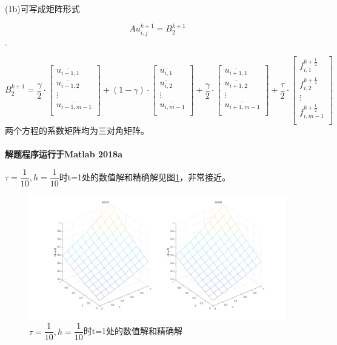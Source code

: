 \documentclass[withoutpreface,bwprint]{cumcmthesis} %
\begin{document}
(1b)可写成矩阵形式

$$A u_{i,j}^{k+1}=B_2^{k+1}$$.

$$
B_2^{k+1}=
\dfrac{\gamma}{2}\cdot
\begin{bmatrix}
\overline{u_{i-1,1}} \\
\overline{u_{i-1,2}} \\
\vdots \\
\overline{u_{i-1,m-1}} \\
\end{bmatrix}
+(1-\gamma) \cdot
\begin{bmatrix}
\overline{u_{i,1}} \\
\overline{u_{i,2}} \\
\vdots \\
\overline{u_{i,m-1}} \\
\end{bmatrix}
+\dfrac{\gamma}{2}\cdot
\begin{bmatrix}
\overline{u_{i+1,1}} \\
\overline{u_{i+1,2}} \\
\vdots \\
\overline{u_{i+1,m-1}} \\
\end{bmatrix}
+\dfrac{\tau}{2} \cdot
\begin{bmatrix}
f_{i,1}^{k+\frac{1}{2}}\\
f_{i,2}^{k+\frac{1}{2}}\\
\vdots \\
f_{i,m-1}^{k+\frac{1}{2}}\\
\end{bmatrix}
$$
两个方程的系数矩阵均为三对角矩阵。
~\\
~\\




\textbf{解题程序运行于Matlab 2018a}

$\tau=\dfrac{1}{10},h=\dfrac{1}{10}$时t=1处的数值解和精确解见图\ref{fig:f1}，非常接近。
\begin{figure}
	\centering
	\includegraphics[width=1\linewidth]{figures/f1}
	\caption{$\tau=\dfrac{1}{10},h=\dfrac{1}{10}$时t=1处的数值解和精确解}
	\label{fig:f1}
\end{figure}
\end{document}
